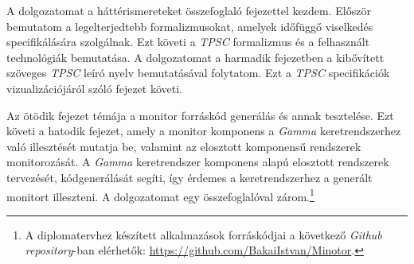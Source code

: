 A dolgozatomat a háttérismereteket összefoglaló fejezettel kezdem.
Először bemutatom a legelterjedtebb formalizmusokat, amelyek időfüggő viselkedés specifikálására szolgálnak.
Ezt követi a \textit{TPSC} formalizmus és a felhasznált technológiák bemutatása.
A dolgozatomat a harmadik fejezetben a kibővített szöveges \textit{TPSC} leíró nyelv bemutatásával folytatom.
Ezt a \textit{TPSC} specifikációk vizualizációjáról szóló fejezet követi.

Az ötödik fejezet témája a monitor forráskód generálás és annak tesztelése.
Ezt követi a hatodik fejezet, amely a monitor komponens a \textit{Gamma} keretrendszerhez való illesztését mutatja be, valamint az elosztott komponensű rendszerek monitorozását.
A \textit{Gamma} keretrendszer komponens alapú elosztott rendszerek tervezését, kódgenerálását segíti, így érdemes a keretrendszerhez a generált monitort illeszteni.
A dolgozatomat egy összefoglalóval zárom.\footnote{A diplomatervhez készített alkalmazások forráskódjai a következő \textit{Github} \textit{repository}-ban elérhetők:
\url{https://github.com/BakaiIstvan/Minotor}.}